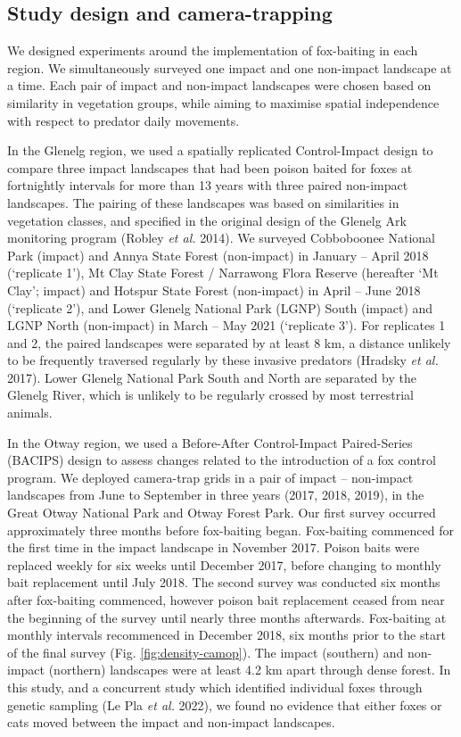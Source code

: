 \documentclass[preprint, 3p, authoryear]{elsarticle} %
\begin{document}
\hypertarget{study-design-and-camera-trapping}{%
\subsection{Study design and camera-trapping}\label{study-design-and-camera-trapping}}

We designed experiments around the implementation of fox-baiting in each region. We simultaneously surveyed one impact and one non-impact landscape at a time. Each pair of impact and non-impact landscapes were chosen based on similarity in vegetation groups, while aiming to maximise spatial independence with respect to predator daily movements.

In the Glenelg region, we used a spatially replicated Control-Impact design to compare three impact landscapes that had been poison baited for foxes at fortnightly intervals for more than 13 years with three paired non-impact landscapes. The pairing of these landscapes was based on similarities in vegetation classes, and specified in the original design of the Glenelg Ark monitoring program (Robley \emph{et al.} 2014). We surveyed Cobboboonee National Park (impact) and Annya State Forest (non-impact) in January -- April 2018 (`replicate 1'), Mt Clay State Forest / Narrawong Flora Reserve (hereafter `Mt Clay'; impact) and Hotspur State Forest (non-impact) in April -- June 2018 (`replicate 2'), and Lower Glenelg National Park (LGNP) South (impact) and LGNP North (non-impact) in March -- May 2021 (`replicate 3'). For replicates 1 and 2, the paired landscapes were separated by at least 8 km, a distance unlikely to be frequently traversed regularly by these invasive predators (Hradsky \emph{et al.} 2017). Lower Glenelg National Park South and North are separated by the Glenelg River, which is unlikely to be regularly crossed by most terrestrial animals.

In the Otway region, we used a Before-After Control-Impact Paired-Series (BACIPS) design to assess changes related to the introduction of a fox control program. We deployed camera-trap grids in a pair of impact -- non-impact landscapes from June to September in three years (2017, 2018, 2019), in the Great Otway National Park and Otway Forest Park. Our first survey occurred approximately three months before fox-baiting began. Fox-baiting commenced for the first time in the impact landscape in November 2017. Poison baits were replaced weekly for six weeks until December 2017, before changing to monthly bait replacement until July 2018. The second survey was conducted six months after fox-baiting commenced, however poison bait replacement ceased from near the beginning of the survey until nearly three months afterwards. Fox-baiting at monthly intervals recommenced in December 2018, six months prior to the start of the final survey (Fig. \ref{fig:density-camop}). The impact (southern) and non-impact (northern) landscapes were at least 4.2 km apart through dense forest. In this study, and a concurrent study which identified individual foxes through genetic sampling (Le Pla \emph{et al.} 2022), we found no evidence that either foxes or cats moved between the impact and non-impact landscapes.
\end{document}
